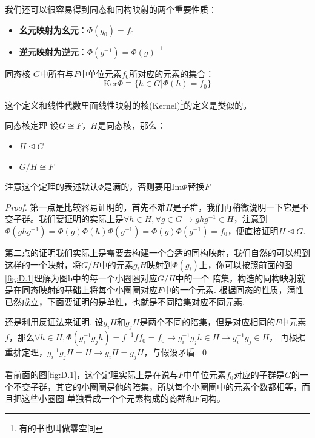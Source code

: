 我们还可以很容易得到同态和同构映射的两个重要性质：
\begin{itemize}
    \item \textbf{幺元映射为幺元}：$\Phi(g_0)=f_0$
    \item \textbf{逆元映射为逆元}：$\Phi(g^{-1})=\Phi(g)^{-1}$
\end{itemize}
\begin{define}{同态核}
    $G$中所有与$F$中单位元素$f_0$所对应的元素的集合：
    \[\mathrm{Ker}\Phi\equiv\{h\in G|\Phi(h)=f_0\}\]
\end{define}
这个定义和线性代数里面线性映射的核(Kernel)\footnote{有的书也叫做零空间}的定义是类似的。
\begin{theorem}{同态核定理}
    设$G\cong F$，$H$是同态核，那么：
    \begin{itemize}
        \item $H\unlhd G$
        \item $G/H\cong F$
    \end{itemize}
    注意这个定理的表述默认$\Phi$是满的，否则要用$\mathrm{Im}\Phi$替换$F$
\end{theorem}
\begin{proof}
    第一点是比较容易证明的，首先不难$H$是子群，我们再稍微说明一下它是不变子群。我们要证明的实际上是$\forall h\in H,\forall g\in G\rightarrow ghg^{-1}\in H$，注意到
    $\Phi(ghg^{-1})=\Phi(g)\Phi(h)\Phi(g^{-1})=\Phi(g)\Phi(g^{-1})=f_0$，便直接证明$H\unlhd G$.

    第二点的证明我们实际上是需要去构建一个合适的同构映射，我们自然的可以想到这样的一个映射，将$G/H$中的元素$g_iH$映射到$\Phi(g_i)$上，你可以按照前面的图\ref{fig:D.1}理解为图b中的每一个小圈圈对应$G/H$中的一个
    陪集，构造的同构映射就是在同态映射的基础上将每个小圈圈对应$F$中的一个元素. 根据同态的性质，满性已然成立，下面要证明的是单性，也就是不同陪集对应不同元素.

    还是利用反证法来证明. 设$g_iH$和$g_jH$是两个不同的陪集，但是对应相同的$F$中元素$f$，那么$\forall h\in H, \Phi(g_i^{-1}g_jh)=f^{-1}ff_0=f_0\rightarrow g_i^{-1}g_jh\in H\rightarrow g_i^{-1}g_j\in H$，
    再根据重排定理，$g_i^{-1}g_jH=H\rightarrow g_iH=g_jH$，与假设矛盾.
    \qed
\end{proof}

看前面的图\ref{fig:D.1}，这个定理实际上是在说与$F$中单位元素$f_0$对应的子群是$G$的一个不变子群，其它的小圈圈是他的陪集，所以每个小圈圈中的元素个数都相等，而且把这些小圈圈
单独看成一个个元素构成的商群和$F$同构。

